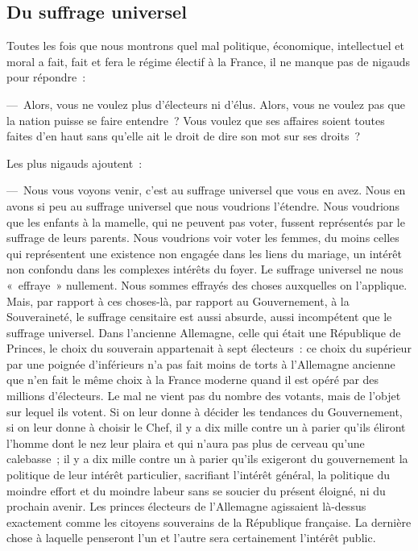 \documentclass[french,twoside]{book} %
\begin{document}
\subsection[{Du suffrage universel}]{Du suffrage universel}
\noindent Toutes les fois que nous montrons quel mal politique, économique, intellectuel et moral a fait, fait et fera le régime électif à la France, il ne manque pas de nigauds pour répondre :\par
— Alors, vous ne voulez plus d’électeurs ni d’élus. Alors, vous ne voulez pas que la nation puisse se faire entendre ? Vous voulez que ses affaires soient toutes faites d’en haut sans qu’elle ait le droit de dire son mot sur ses droits ?\par
Les plus nigauds ajoutent :\par
— Nous vous voyons venir, c’est au suffrage universel que vous en avez. Nous en avons si peu au suffrage universel que nous voudrions l’étendre. Nous voudrions que les enfants à la mamelle, qui ne peuvent pas voter, fussent représentés par le suffrage de leurs parents. Nous voudrions voir voter les femmes, du moins celles qui représentent une existence non engagée dans les liens du mariage, un intérêt non confondu dans les complexes intérêts du foyer. Le suffrage universel ne nous « effraye » nullement. Nous sommes effrayés des choses auxquelles on l’applique. Mais, par rapport à ces choses-là, par rapport au Gouvernement, à la Souveraineté, le suffrage censitaire est aussi absurde, aussi incompétent que le suffrage universel. Dans l’ancienne Allemagne, celle qui était une République de Princes, le choix du souverain appartenait à sept électeurs : ce choix du supérieur par une poignée d’inférieurs n’a pas fait moins de torts à l’Allemagne ancienne que n’en fait le même choix à la France moderne quand il est opéré par des millions d’électeurs. Le mal ne vient pas du nombre des votants, mais de l’objet sur lequel ils votent. Si on leur donne à décider les tendances du Gouvernement, si on leur donne à choisir le Chef, il y a dix mille contre un à parier qu’ils éliront l’homme dont le nez leur plaira et qui n’aura pas plus de cerveau qu’une calebasse ; il y a dix mille contre un à parier qu’ils exigeront du gouvernement la politique de leur intérêt particulier, sacrifiant l’intérêt général, la politique du moindre effort et du moindre labeur sans se soucier du présent éloigné, ni du prochain avenir. Les princes électeurs de l’Allemagne agissaient là-dessus exactement comme les citoyens souverains de la République française. La dernière chose à laquelle penseront l’un et l’autre sera certainement l’intérêt public.\par
\end{document}
